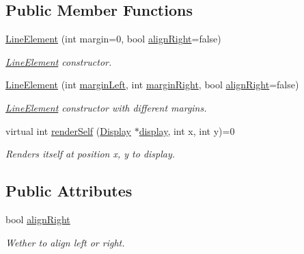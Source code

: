 \subsection*{Public Member Functions}
\begin{DoxyCompactItemize}
\item 
\mbox{\hyperlink{classScreen_1_1LineElement_a3f822f160e15ee96022b95026e52ee42}{Line\+Element}} (int margin=0, bool \mbox{\hyperlink{classScreen_1_1LineElement_a0c5f4e33c2df1dce8e4e45b90dac1423}{align\+Right}}=false)
\begin{DoxyCompactList}\small\item\em \mbox{\hyperlink{classScreen_1_1LineElement}{Line\+Element}} constructor. \end{DoxyCompactList}\item 
\mbox{\hyperlink{classScreen_1_1LineElement_a65fe216ee2acbc1191b1fd51b25b2ec7}{Line\+Element}} (int \mbox{\hyperlink{classScreen_1_1LineElement_a9ed23f9510a11334af9be6f53965f7a6}{margin\+Left}}, int \mbox{\hyperlink{classScreen_1_1LineElement_a3a2077f01072be8e8fd0f4539b85beb0}{margin\+Right}}, bool \mbox{\hyperlink{classScreen_1_1LineElement_a0c5f4e33c2df1dce8e4e45b90dac1423}{align\+Right}}=false)
\begin{DoxyCompactList}\small\item\em \mbox{\hyperlink{classScreen_1_1LineElement}{Line\+Element}} constructor with different margins. \end{DoxyCompactList}\item 
virtual int \mbox{\hyperlink{classScreen_1_1LineElement_a667fbf6505fbed274ca9a3deac3fef9e}{render\+Self}} (\mbox{\hyperlink{classDisplay}{Display}} $\ast$\mbox{\hyperlink{classScreen_aad713267725e8aa8a8def951a07de641}{display}}, int x, int y)=0
\begin{DoxyCompactList}\small\item\em Renders itself at position x, y to display. \end{DoxyCompactList}\end{DoxyCompactItemize}
\subsection*{Public Attributes}
\begin{DoxyCompactItemize}
\item 
\mbox{\label{classScreen_1_1LineElement_a0c5f4e33c2df1dce8e4e45b90dac1423}} 
bool \mbox{\hyperlink{classScreen_1_1LineElement_a0c5f4e33c2df1dce8e4e45b90dac1423}{align\+Right}}
\begin{DoxyCompactList}\small\item\em Wether to align left or right. \end{DoxyCompactList}\end{DoxyCompactItemize}

